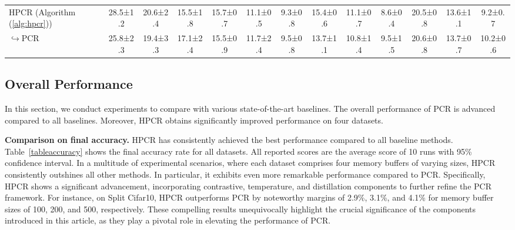 \begin{table}[t]
\begin{tabular}{l|ccc|ccc|ccc|ccc}
HPCR (Algorithm (\ref{alg:hpcr}))   & {28.5\scriptsize±1.2}& {20.6\scriptsize±2.4}                 & {15.5\scriptsize±1.8}                 & {15.7\scriptsize±0.7}                  & {11.1\scriptsize±0.5}                  & {9.3\scriptsize±0.8} & {15.4\scriptsize±0.6}                   & {11.1\scriptsize±0.7}                  & {8.6\scriptsize±0.4} & {20.5\scriptsize±0.8}                   & {13.6\scriptsize±1.1}                  & {9.2\scriptsize±0.7}\\
$\hookrightarrow$PCR   & 25.8\scriptsize±2.3& 19.4\scriptsize±3.3                 & 17.1\scriptsize±2.4                 & 15.5\scriptsize±0.9                  & 11.7\scriptsize±2.4                  & 9.5\scriptsize±0.8                  & 13.7\scriptsize±1.1 & 10.8\scriptsize±1.4                   & 9.5\scriptsize±1.5                  & 20.6\scriptsize±0.8 & 13.7\scriptsize±0.7                   & 10.2\scriptsize±0.6\\
\hline
\end{tabular}
\vspace{-4ex}
\end{table}




\subsection{Overall Performance}
In this section, we conduct experiments to compare with various state-of-the-art baselines. The overall performance of PCR is advanced compared to all baselines. Moreover, HPCR obtains significantly improved performance on four datasets.

\textbf{Comparison on final accuracy.} HPCR has consistently achieved the best performance compared to all baseline methods. 
Table~\ref{tableaccuracy} shows the final accuracy rate for all datasets. All reported scores are the average score of 10 runs with 95\%
confidence interval. In a multitude of experimental scenarios, where each dataset comprises four memory buffers of varying sizes, HPCR consistently outshines all other methods. In particular, it exhibits even more remarkable performance compared to PCR. Specifically, HPCR shows a significant advancement, incorporating contrastive, temperature, and distillation components to further refine the PCR framework. For instance, on Split Cifar10, HPCR outperforms PCR by noteworthy margins of 2.9\%, 3.1\%, and 4.1\% for memory buffer sizes of 100, 200, and 500, respectively. These compelling results unequivocally highlight the crucial significance of the components introduced in this article, as they play a pivotal role in elevating the performance of PCR. 


